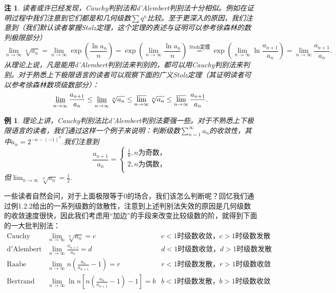 \documentclass{article}
\newtheorem{example}{例}[subsection]
\newtheorem{note}{注}[subsection]
\begin{document}
\begin{note}
读者或许已经发现，Cauchy判别法和d'Alembert判别法十分相似。例如在证明过程中我们注意到它们都是和几何级数$\sum q^n$比较。至于更深入的原因，我们注意到（我们默认读者掌握Stolz定理，这个定理的表述与证明可以参考徐森林的数列极限部分）
$$
\lim_{n\rightarrow \infty} \sqrt[n]{a_n}=\lim_{n\rightarrow \infty} \exp \left( \frac{\ln a_n}{n} \right) =\exp \left( \lim_{n\rightarrow \infty} \frac{\ln a_n}{n} \right) \overset{\text{Stolz定理}}{=}\exp \left( \lim_{n\rightarrow \infty} \ln \frac{a_{n+1}}{a_n} \right) =\lim_{n\rightarrow \infty} \frac{a_{n+1}}{a_n}.
$$
从理论上说，凡是能用d'Alembert判别法来判别的，都可以用Cauchy判别法来判别。对于熟悉上下极限语言的读者可以观察下面的广义Stolz定理（其证明读者可以参考徐森林数项级数部分）：
$$\varliminf_{n\to\infty}\frac{a_{n+1}}{a_n}\le\varliminf_{n\to\infty}\sqrt[n]{a_n}\le\varlimsup_{n\to\infty}\sqrt[n]{a_n}\le\varlimsup_{n\to\infty}\frac{a_{n+1}}{a_n}.$$
\end{note}
\begin{example}
理论上讲，Cauchy判别法比d'Alembert判别法要强一些。对于不熟悉上下极限语言的读者，我们通过这样一个例子来说明：判断级数$\sum_{n=1}^\infty a_n$的收敛性，其中$a_n=2^{-n-(-1)^n}$.我们注意到
$$
\frac{a_{n+1}}{a_n}=\begin{cases}
	\frac{1}{8},n\text{为奇数，}\\
	2,n\text{为偶数，}\\
\end{cases}
$$
但$\lim_{n\to\infty}\sqrt[n]{a_n}=\frac{1}{2}$.
\end{example}
一些读者自然会问，对于上面极限等于$0$的场合，我们该怎么判断呢？回忆我们通过例1.2.2给出的一系列级数的敛散性，注意到上述判别法失效的原因是几何级数的收敛速度很快，因此我们考虑用“加边”的手段来改变比较级数的阶，就得到下面的一大批判别法：
$$
\begin{matrix}
	\mathrm{Cauchy}&		\lim_{n\rightarrow \infty} \sqrt[n]{a_n}=c&		c<1\text{时级数收敛，}c>1\text{时级数发散}\\
	\mathrm{d'Alembert}&		\lim_{n\rightarrow \infty} \frac{a_{n+1}}{a_n}=d&		d<1\text{时级数收敛，}d>1\text{时级数发散}\\
	\mathrm{Raabe}&		\lim_{n\rightarrow \infty} n\left( \frac{a_n}{a_{n+1}}-1 \right) =r&		r<1\text{时级数发散，}r>1\text{时级数收敛}\\
	\mathrm{Bertrand}&		\lim_{n\rightarrow \infty} \ln n\left[ n\left( \frac{a_n}{a_{n+1}}-1 \right) -1 \right] =b&		b<1\text{时级数发散，}b>1\text{时级数收敛}\\
\end{matrix}
$$
\end{document}
